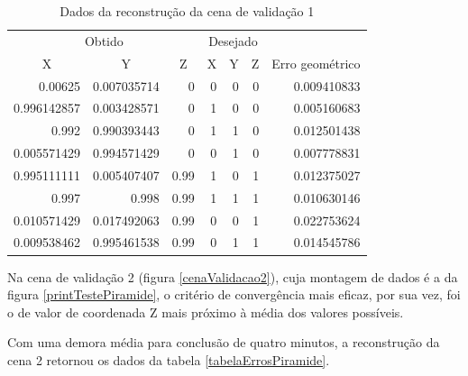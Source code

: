 		\begin{table}
			\caption{Dados da reconstrução da cena de validação 1}
			\label{tabelaErrosCubo}
			\begin{center}
				\begin{tabular}{r r r | r r r | r}
					\hline
					\multicolumn{3}{c}{Obtido} & \multicolumn{3}{c}{Desejado}\\
					\cline{1-6}
					\multicolumn{1}{c}{X} & \multicolumn{1}{c}{Y} & \multicolumn{1}{c}{Z} & \multicolumn{1}{c}{X} & \multicolumn{1}{c}{Y} & \multicolumn{1}{c}{Z} & \multicolumn{1}{c}{Erro geométrico}\\
					\hline			
					0.00625				&			0.007035714		&		0				&		0		&		0		&		0		&		0.009410833\\
					0.996142857		&			0.003428571		&		0				&		1		&		0		&		0		&		0.005160683\\
					0.992					&			0.990393443		&		0				&		1		&		1		&		0		&		0.012501438\\
					0.005571429		& 		0.994571429		&		0				&		0		&		1		&		0		&		0.007778831\\
					0.995111111		&			0.005407407		&		0.99		&		1		&		0		&		1		&		0.012375027\\
					0.997					&			0.998					&		0.99		&		1		&		1		&		1		&		0.010630146\\
					0.010571429		&			0.017492063		&		0.99		&		0		&		0		&		1		&		0.022753624\\
					0.009538462		&			0.995461538		&		0.99		&		0		&		1		&		1		&		0.014545786\\
					\hline
				\end{tabular}
			\end{center}
		\end{table}
		
		Na cena de validação 2 (figura \ref{cenaValidacao2}), cuja montagem de dados é a da figura \ref{printTestePiramide}, o critério de convergência mais eficaz, por sua vez, foi o de valor de coordenada Z mais próximo à média dos valores possíveis.
		
		Com uma demora média para conclusão de quatro minutos, a reconstrução da cena 2 retornou os dados da tabela \ref{tabelaErrosPiramide}.
		
